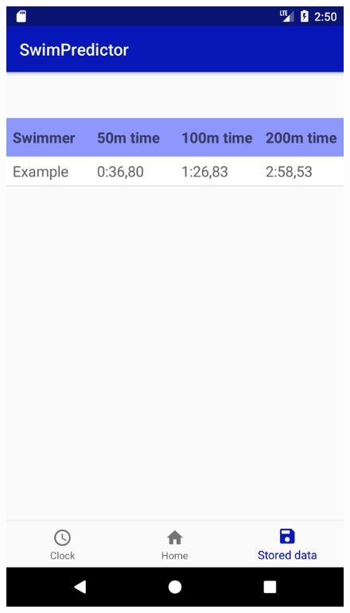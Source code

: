 \begin{figure}[ht]
\begin{minipage}{0.15\textwidth}
\includegraphics[width=\textwidth]{visualisation/database_view.png}
\end{minipage}
\begin{minipage}{0.15\textwidth}

\end{minipage}
\end{figure}
